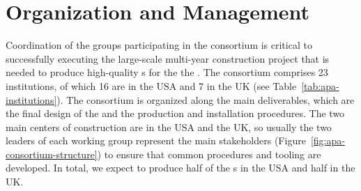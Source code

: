 \section{Organization and Management}
\label{sec:fdsp-apa-org}

Coordination of the groups participating in the   consortium is critical to successfully executing the large-scale multi-year construction project that is needed to produce high-quality s for the the  .   The  consortium comprises \num{23} institutions, of which \num{16} are in the USA and \num{7} in the UK (see Table~\ref{tab:apa-institutions}). The consortium is organized along the main deliverables, which are the final design of the  and the  production and installation procedures. The two main centers of  construction are in the USA and the UK, so usually the two leaders of each working group represent the main stakeholders (Figure~\ref{fig:apa-consortium-structure}) to ensure that common procedures and tooling are developed.  In total, we expect to produce half of the  s in the USA and half in the UK.

